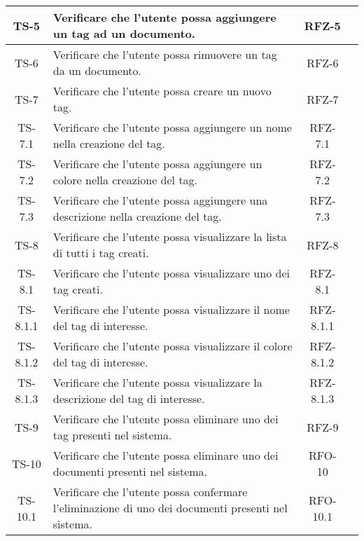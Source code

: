\begin{xltabular}{\textwidth}{| c | X | c | c |}
    \hline
    TS-5 & Verificare che l’utente possa aggiungere un tag ad un documento. & RFZ-5 & \textcolor{xmarkcolor}{} \\
    \hline
    TS-6 & Verificare che l’utente possa rimuovere un tag da un documento. & RFZ-6 & \textcolor{xmarkcolor}{} \\
    \hline
    TS-7 & Verificare che l’utente possa creare un nuovo tag. & RFZ-7 & \textcolor{xmarkcolor}{} \\
    \hline
    TS-7.1 & Verificare che l’utente possa aggiungere un nome nella creazione del tag. & RFZ-7.1 & \textcolor{xmarkcolor}{} \\
    \hline
    TS-7.2 & Verificare che l’utente possa aggiungere un colore nella creazione del tag. & RFZ-7.2 & \textcolor{xmarkcolor}{} \\
    \hline
    TS-7.3 & Verificare che l’utente possa aggiungere una descrizione nella creazione del tag. & RFZ-7.3 & \textcolor{xmarkcolor}{} \\
    \hline
    TS-8 & Verificare che l’utente possa visualizzare la lista di tutti i tag creati. & RFZ-8 & \textcolor{xmarkcolor}{} \\
    \hline
    TS-8.1 & Verificare che l’utente possa visualizzare uno dei tag creati. & RFZ-8.1 & \textcolor{xmarkcolor}{} \\
    \hline
    TS-8.1.1 & Verificare che l’utente possa visualizzare il nome del tag di interesse. & RFZ-8.1.1 & \textcolor{xmarkcolor}{} \\
    \hline
    TS-8.1.2 &  Verificare che l’utente possa visualizzare il colore del tag di interesse. & RFZ-8.1.2 & \textcolor{xmarkcolor}{} \\
    \hline
    TS-8.1.3 & Verificare che l'utente possa visualizzare la descrizione del tag di interesse. & RFZ-8.1.3 & \textcolor{xmarkcolor}{} \\
    \hline
    TS-9 & Verificare che l’utente possa eliminare uno dei tag presenti nel sistema. & RFZ-9 & \textcolor{xmarkcolor}{} \\
    \hline
    TS-10 & Verificare che l’utente possa eliminare uno dei documenti presenti nel sistema. & RFO-10 & \textcolor{xmarkcolor}{} \\
    \hline
    TS-10.1 & Verificare che l’utente possa confermare l’eliminazione di uno dei documenti presenti nel sistema. & RFO-10.1 & \textcolor{xmarkcolor}{} \\

\end{xltabular}
